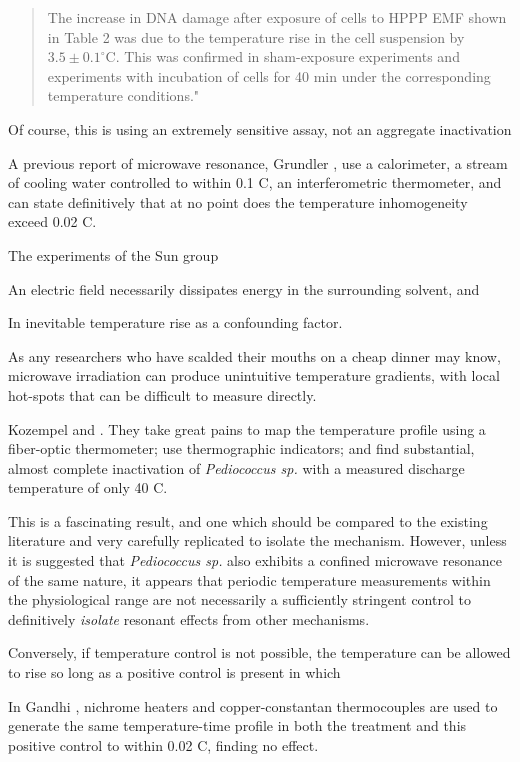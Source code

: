 \documentclass[paper.tex]{subfiles}
\begin{document}
\begin{multicols}{1}
\begin{quote}
	
	The increase in DNA damage after exposure of cells to HPPP EMF shown in Table 2 was due to the temperature rise in the cell suspension by $3.5\pm0.1^{\circ}  $C. This was confirmed in sham-exposure experiments and experiments with incubation of cells for 40 min under the corresponding temperature conditions."
	
\end{quote}

Of course, this is using an extremely sensitive assay, not an aggregate inactivation 

A previous report of microwave resonance, Grundler \cite{Sharp1983}, use a calorimeter, a stream of cooling water controlled to within 0.1 C, an interferometric thermometer, and can state definitively that at no point does the temperature inhomogeneity exceed 0.02 C.

The experiments of the Sun group 

An electric field necessarily dissipates energy in the surrounding solvent, and 

In inevitable temperature rise as a confounding factor. 

As any researchers who have scalded their mouths on a cheap dinner may know, microwave irradiation can produce unintuitive temperature gradients, with local hot-spots that can be difficult to measure directly.

Kozempel \cite{Preliminary1997} and \cite{Inactivationa}. They take great pains to map the temperature profile using a fiber-optic thermometer; use thermographic indicators; and find substantial, almost complete inactivation of {\it Pediococcus sp.} with a measured discharge temperature of only 40 C.

This is a fascinating result, and one which should be compared to the existing literature and very carefully replicated to isolate the mechanism. However, unless it is suggested that {\it Pediococcus sp.} also exhibits a confined microwave resonance of the same nature, it appears that periodic temperature measurements within the physiological range are not necessarily a sufficiently stringent control to definitively {\it isolate} resonant effects from other mechanisms.

Conversely, if temperature control is not possible, the temperature can be allowed to rise so long as a positive control is present in which 

In Gandhi \cite{Basic1983}, nichrome heaters and copper-constantan thermocouples are used to generate the same temperature-time profile in both the treatment and this positive control to within 0.02 C, finding no effect. 


\end{multicols}
\end{document}
